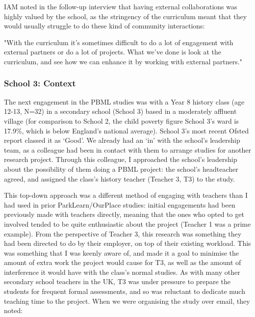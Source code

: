 IAM noted in the follow-up interview that having external collaborations was highly valued by the school, as the stringency of the curriculum meant that they would usually struggle to do these kind of community interactions:

\begin{displayquote}
"With the curriculum it's sometimes difficult to do a lot of engagement with external partners or do a lot of projects. What we've done is look at the curriculum, and see how we can enhance it by working with external partners."
\end{displayquote}

\subsubsection{School 3: Context}

The next engagement in the PBML studies was with a Year 8 history class (age 12-13, N=32) in a secondary school (School 3) based in a moderately affluent village (for comparison to School 2, the child poverty figure School 3's ward is 17.9\%, which is below England's national average). School 3's most recent Ofsted report classed it as `Good'. We already had an `in' with the school's leadership team, as a colleague had been in contact with them to arrange studies for another research project. Through this colleague, I approached the school's leadership about the possibility of them doing a PBML project: the school's headteacher agreed, and assigned the class's history teacher (Teacher 3, T3) to the study. 

This top-down approach was a different method of engaging with teachers than I had used in prior ParkLearn/OurPlace studies: initial engagements had been previously made with teachers directly, meaning that the ones who opted to get involved tended to be quite enthusiastic about the project (Teacher 1 was a prime example). From the perspective of Teacher 3, this research was something they had been directed to do by their employer, on top of their existing workload. This was something that I was keenly aware of, and made it a goal to minimise the amount of extra work the project would cause for T3, as well as the amount of interference it would have with the class's normal studies. As with many other secondary school teachers in the UK, T3 was under pressure to prepare the students for frequent formal assessments, and so was reluctant to dedicate much teaching time to the project. When we were organising the study over email, they noted:

